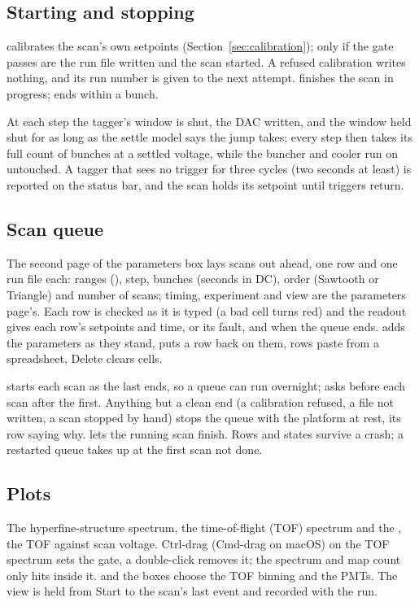 \subsection{Starting and stopping}

 calibrates the scan's own setpoints (Section~\ref{sec:calibration}); only
if the gate passes are the run file written and the scan started. A refused calibration
writes nothing, and its run number is given to the next attempt. 
finishes the scan in progress;  ends within a bunch.

At each step the tagger's window is shut, the DAC written, and the window held shut for as
long as the settle model says the jump takes; every step then takes its full count of
bunches at a settled voltage, while the buncher and cooler run on untouched. A tagger that
sees no trigger for three cycles (two seconds at least) is reported on the status bar, and
the scan holds its setpoint until triggers return.

\subsection{Scan queue}

The second page of the parameters box lays scans out ahead, one row and one run file each:
ranges (), step, bunches (seconds in DC), order (Sawtooth or Triangle)
and number of scans; timing, experiment and view are the parameters page's. Each row is
checked as it is typed (a bad cell turns red) and the readout gives each row's setpoints and
time, or its fault, and when the queue ends.  adds the parameters as they
stand,  puts a row back on them, rows paste from a spreadsheet, Delete clears
cells.

 starts each scan as the last ends, so a queue can run overnight;
 asks before each scan after the first. Anything but a clean end (a calibration
refused, a file not written, a scan stopped by hand) stops the queue with the platform at
rest, its row saying why.  lets the running scan finish.
Rows and states survive a crash; a restarted queue takes up at the first scan not done.

\subsection{Plots}

The hyperfine-structure spectrum, the time-of-flight (TOF) spectrum and the ,
the TOF against scan voltage. Ctrl-drag (Cmd-drag on macOS) on the TOF
spectrum sets the gate, a double-click removes it; the spectrum and map count only hits
inside it.  and the  boxes choose the TOF binning and the PMTs.
The view is held from Start to the scan's last event and recorded with the run.

